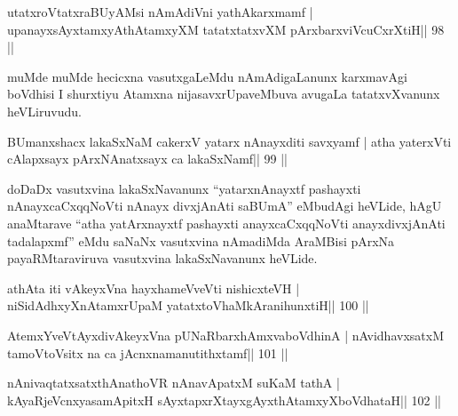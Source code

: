 \begin{shl}
\footnotemark[1]utatxroVtatxraBUyAMsi nAmAdiVni yathAkarxmamf |
upanayxsAyx\s\s tamxyAthAtamxyXM tatatxtatxvXM pArxbarxviVcuCxrXtiH\hfill || 98 ||
\end{shl}

\begin{artha}
muMde muMde hecicxna vasutxgaLeMdu nAmAdigaLanunx karxmavAgi boVdhisi I shurxtiyu Atamxna nijasavxrUpaveMbuva avugaLa tatatxvXvanunx heVLiruvudu.
\end{artha}

\begin{shl}
BUmanxshacx lakaSxNaM cakerxV yatarx nAnayxditi savxyamf |
atha yaterxVti cAlapxsayx pArxNAnatxsayx ca lakaSxNamf\hfill || 99 ||
\end{shl}

\begin{artha}
doDaDx vasutxvina lakaSxNavanunx ``yatarxnAnayxtf 
pashayxti nAnayxcaCxqqNoVti nAnayx divxjAnAti saBUmA'' eMbudAgi
heVLide, hAgU anaMtarave ``atha yatArxnayxtf pashayxti
anayxcaCxqqNoVti anayxdivxjAnAti tadalapxmf'' eMdu saNaNx vasutxvina
nAmadiMda AraMBisi pArxNa payaRMtaraviruva vasutxvina lakaSxNavanunx
heVLide. 
\end{artha}


\begin{shl}
athAta iti vAkeyxVna hayxhameVveVti nishicxteVH |
niSidAdhxyXnAtamxrUpaM yatatxtoV\s haMkAranihunxtiH\hfill || 100 ||
\end{shl}

\begin{shl}
AtemxYveVtAyxdivAkeyxVna pUNaRbarxhAmxvaboVdhinA |
nAvidhavxsatxM tamoV\s toV\s sitx na ca jAcnxnamanutithxtamf\hfill || 101 ||
\end{shl}

\begin{shl}
nAnivaqtatxsatxthA\s nathoVR nAnavApatxM suKaM tathA |
kAyaRjeVcnxyasamApitxH sAyxtapxrXtayxgAyxthAtamxyXboVdhataH\hfill || 102 ||
\end{shl}

